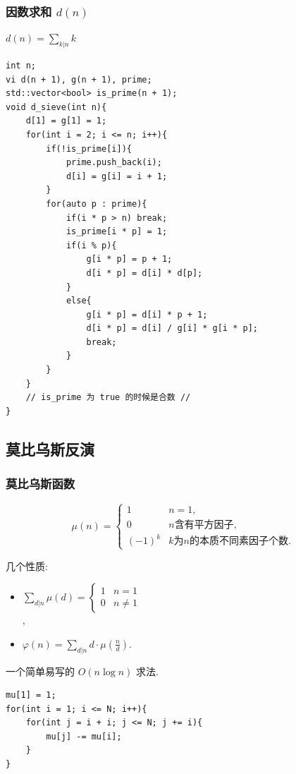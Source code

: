 \documentclass[UTF8, a4paper, titlepage, twoside]{ctexart}
\begin{document}
\subsubsection{ 因数求和 $d(n)$ }
$d(n) = \sum_{k | n} k$
\begin{lstlisting}
int n;
vi d(n + 1), g(n + 1), prime;
std::vector<bool> is_prime(n + 1);
void d_sieve(int n){
    d[1] = g[1] = 1;
    for(int i = 2; i <= n; i++){
        if(!is_prime[i]){
            prime.push_back(i);
            d[i] = g[i] = i + 1;
        }
        for(auto p : prime){
            if(i * p > n) break;
            is_prime[i * p] = 1;
            if(i % p){
                g[i * p] = p + 1;
                d[i * p] = d[i] * d[p];                
            }
            else{
                g[i * p] = d[i] * p + 1;
                d[i * p] = d[i] / g[i] * g[i * p];
                break;
            }
        }
    }
    // is_prime 为 true 的时候是合数 //
}
\end{lstlisting}

\subsection{ 莫比乌斯反演 }
\subsubsection{ 莫比乌斯函数 }
$$
\mu(n) = \left\{\begin{array}{cl}1 & n=1,\\
0 & n\mbox{含有平方因子},\\
(-1)^k & k\mbox{为}n\mbox{的本质不同素因子个数}.\end{array}\right.
$$

几个性质: 
\begin{itemize}
    \item $\sum_{d|n}\mu(d) = \left\{\begin{array}{cl}1&n=1\\0&n\neq1\end{array}\right.$ \\,
    \item $\varphi(n) = \sum_{d|n}d \cdot \mu(\frac{n}{d})$.
\end{itemize}

一个简单易写的 $O(n \log n)$ 求法.
\begin{lstlisting}
mu[1] = 1;
for(int i = 1; i <= N; i++){
    for(int j = i + i; j <= N; j += i){
        mu[j] -= mu[i];
    }
}
\end{lstlisting}
\end{document}
